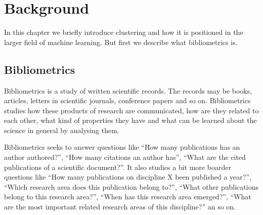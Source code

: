 \chapter{Background}
\label{chapter:background}

% 


In this chapter we briefly introduce clustering and how it is 
positioned in the larger field of machine learning. But first we
describe what bibliometrics is.

\section{Bibliometrics}
\label{sec:bibliometrics}
Bibliometrics is a study of written scientific records. The 
records may be books, articles, letters in scientific journals, 
conference papers and so on. Bibliometrics studies how these 
products of research are communicated, how are they related to 
each other, what kind of properties they have and what can be 
learned about the science in general by analysing them.

Bibliometrics seeks to answer questions like ``How many 
publications has an author authored?'', ``How many citations an 
author has'', ``What are the 
cited publications of a scientific document?''. It also studies
a bit more boarder questions like ``How many publications
on discipline X been published a year?'', ``Which research area
does this publication belong to?'', ``What other publications 
belong to this research area?'', ``When has this research area
emerged?'', ``What are the most important related research areas
of this discipline?'' an so on.

